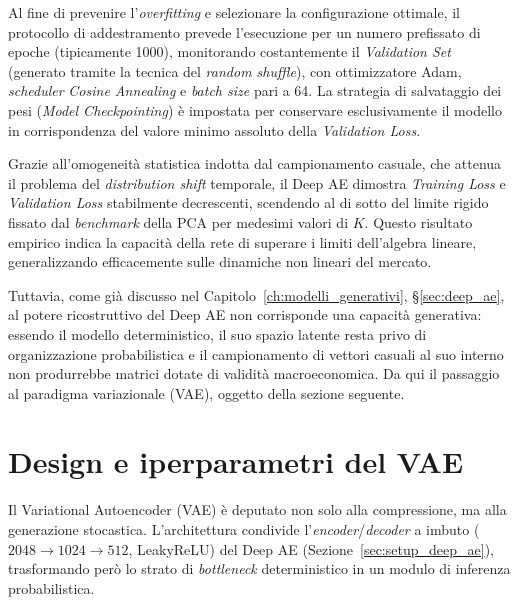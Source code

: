 Al fine di prevenire l'\emph{overfitting} e selezionare la configurazione ottimale, il protocollo di addestramento prevede l'esecuzione per un numero prefissato di epoche (tipicamente 1000), monitorando costantemente il \emph{Validation Set} (generato tramite la tecnica del \emph{random shuffle}), con ottimizzatore Adam, \emph{scheduler} \emph{Cosine Annealing} e \emph{batch size} pari a 64. La strategia di salvataggio dei pesi (\emph{Model Checkpointing}) è impostata per conservare esclusivamente il modello in corrispondenza del valore minimo assoluto della \emph{Validation Loss}.

Grazie all'omogeneità statistica indotta dal campionamento casuale, che attenua il problema del \emph{distribution shift} temporale, il Deep AE dimostra \emph{Training Loss} e \emph{Validation Loss} stabilmente decrescenti, scendendo al di sotto del limite rigido fissato dal \emph{benchmark} della PCA per medesimi valori di $K$. Questo risultato empirico indica la capacità della rete di superare i limiti dell'algebra lineare, generalizzando efficacemente sulle dinamiche non lineari del mercato.

Tuttavia, come già discusso nel Capitolo~\ref{ch:modelli_generativi}, \S\ref{sec:deep_ae}, al potere ricostruttivo del Deep AE non corrisponde una capacità generativa: essendo il modello deterministico, il suo spazio latente resta privo di organizzazione probabilistica e il campionamento di vettori casuali al suo interno non produrrebbe matrici dotate di validità macroeconomica. Da qui il passaggio al paradigma variazionale (VAE), oggetto della sezione seguente.

\section{Design e iperparametri del VAE}
\label{sec:setup_vae}

Il Variational Autoencoder (VAE) è deputato non solo alla compressione, ma alla generazione stocastica. L'architettura condivide l'\emph{encoder}/\emph{decoder} a imbuto ($2048 \to 1024 \to 512$, LeakyReLU) del Deep AE (Sezione~\ref{sec:setup_deep_ae}), trasformando però lo strato di \emph{bottleneck} deterministico in un modulo di inferenza probabilistica.

